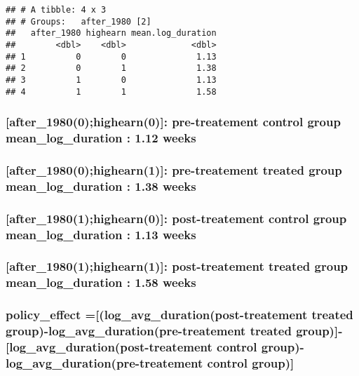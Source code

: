 \documentclass[
]{article}
\begin{document}
\begin{verbatim}
## # A tibble: 4 x 3
## # Groups:   after_1980 [2]
##   after_1980 highearn mean.log_duration
##        <dbl>    <dbl>             <dbl>
## 1          0        0              1.13
## 2          0        1              1.38
## 3          1        0              1.13
## 4          1        1              1.58
\end{verbatim}

\subsubsection{{[}after\_1980(0);highearn(0){]}: pre-treatement control
group mean\_log\_duration : 1.12
weeks}\label{after_19800highearn0-pre-treatement-control-group-mean_log_duration-1.12-weeks}

\subsubsection{{[}after\_1980(0);highearn(1){]}: pre-treatement treated
group mean\_log\_duration : 1.38
weeks}\label{after_19800highearn1-pre-treatement-treated-group-mean_log_duration-1.38-weeks}

\subsubsection{{[}after\_1980(1);highearn(0){]}: post-treatement control
group mean\_log\_duration : 1.13
weeks}\label{after_19801highearn0-post-treatement-control-group-mean_log_duration-1.13-weeks}

\subsubsection{{[}after\_1980(1);highearn(1){]}: post-treatement treated
group mean\_log\_duration : 1.58
weeks}\label{after_19801highearn1-post-treatement-treated-group-mean_log_duration-1.58-weeks}

\subsubsection{policy\_effect ={[}(log\_avg\_duration(post-treatement
treated group)-log\_avg\_duration(pre-treatement treated
group){]}-{[}log\_avg\_duration(post-treatement control
group)-log\_avg\_duration(pre-treatement control
group){]}}\label{policy_effect-log_avg_durationpost-treatement-treated-group-log_avg_durationpre-treatement-treated-group-log_avg_durationpost-treatement-control-group-log_avg_durationpre-treatement-control-group}
\end{document}
